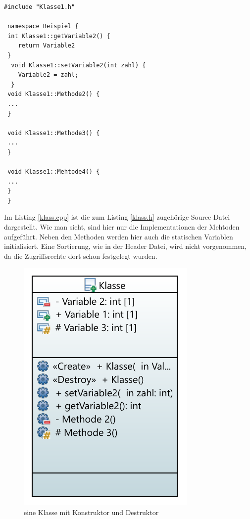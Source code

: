 \begin{lstlisting}[caption = Klasse.cpp,label=klass.cpp]
 #include "Klasse1.h"
 
 namespace Beispiel {
 int Klasse1::getVariable2() {
 	return Variable2
 }
  void Klasse1::setVariable2(int zahl) {
  	Variable2 = zahl;
  }
 void Klasse1::Methode2() {
 ...
 }
  
 void Klasse1::Methode3() {
 ...
 }
   
 void Klasse1::Mehtode4() {
 ...
 }
 }
 \end{lstlisting}
 Im Listing \ref{klass.cpp} ist die zum Listing \ref{klass.h} zugehörige Source Datei dargestellt. Wie man sieht, sind hier nur die Implementationen der Mehtoden aufgeführt. Neben den Methoden werden hier auch die statischen Variablen initialisiert. Eine Sortierung, wie in der Header Datei, wird nicht vorgenommen, da  die Zugriffsrechte dort schon festgelegt wurden. 
  \begin{figure}[H]
  	\centering
  	  	\includegraphics[scale=1]{bilder/pdfvorlagen/model2}
  	\caption[eine Klasse mit Konstruktor und Destruktor]{eine Klasse mit Konstruktor und Destruktor}
  	\label{fig:klasseKonstr}
  \end{figure}
